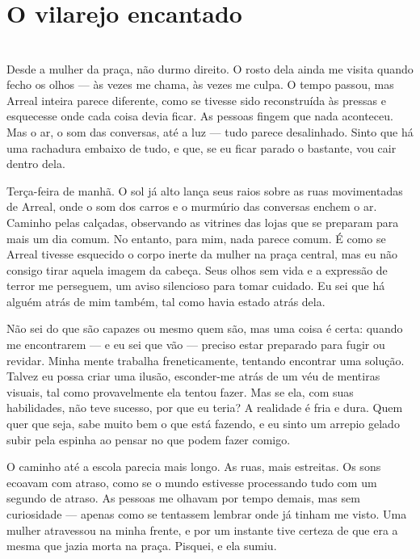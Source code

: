 \newpage

\ifdefined\useChapters
\chapter{O vilarejo encantado}
\else
\chapter{}
\fi

Desde a mulher da praça, não durmo direito.  
O rosto dela ainda me visita quando fecho os olhos — às vezes me chama, às vezes me culpa.  
O tempo passou, mas Arreal inteira parece diferente, como se tivesse sido reconstruída às pressas e esquecesse onde cada coisa devia ficar.
As pessoas fingem que nada aconteceu.  
Mas o ar, o som das conversas, até a luz — tudo parece desalinhado.  
Sinto que há uma rachadura embaixo de tudo, e que, se eu ficar parado o bastante, vou cair dentro dela.

Terça-feira de manhã. O sol já alto lança seus raios sobre as ruas movimentadas de Arreal, onde o som dos carros e o murmúrio das conversas enchem o ar. Caminho pelas calçadas, observando as vitrines das lojas que se preparam para mais um dia comum. No entanto, para mim, nada parece comum. É como se Arreal tivesse esquecido o corpo inerte da mulher na praça central, mas eu não consigo tirar aquela imagem da cabeça. Seus olhos sem vida e a expressão de terror me perseguem, um aviso silencioso para tomar cuidado. Eu sei que há alguém atrás de mim também, tal como havia estado atrás dela.

Não sei do que são capazes ou mesmo quem são, mas uma coisa é certa: quando me encontrarem — e eu sei que vão — preciso estar preparado para fugir ou revidar. Minha mente trabalha freneticamente, tentando encontrar uma solução. Talvez eu possa criar uma ilusão, esconder-me atrás de um véu de mentiras visuais, tal como provavelmente ela tentou fazer. Mas se ela, com suas habilidades, não teve sucesso, por que eu teria? A realidade é fria e dura. Quem quer que seja, sabe muito bem o que está fazendo, e eu sinto um arrepio gelado subir pela espinha ao pensar no que podem fazer comigo.

O caminho até a escola parecia mais longo. As ruas, mais estreitas.  
Os sons ecoavam com atraso, como se o mundo estivesse processando tudo com um segundo de atraso.  
As pessoas me olhavam por tempo demais, mas sem curiosidade — apenas como se tentassem lembrar onde já tinham me visto.  
Uma mulher atravessou na minha frente, e por um instante tive certeza de que era a mesma que jazia morta na praça.  
Pisquei, e ela sumiu.

